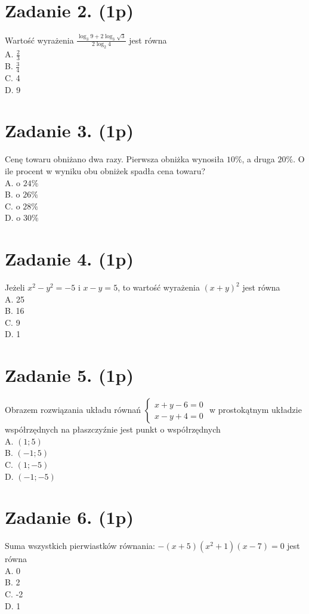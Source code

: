\documentclass[10pt]{article}
\begin{document}
\section*{Zadanie 2. (1p)}
Wartość wyrażenia \(\frac{\log _{3} 9+2 \log _{3} \sqrt{3}}{2 \log _{2} 4}\) jest równa\\
A. \(\frac{2}{3}\)\\
B. \(\frac{3}{4}\)\\
C. 4\\
D. 9

\section*{Zadanie 3. (1p)}
Cenę towaru obniżano dwa razy. Pierwsza obniżka wynosiła \(10 \%\), a druga \(20 \%\). O ile procent w wyniku obu obniżek spadła cena towaru?\\
A. o \(24 \%\)\\
B. o \(26 \%\)\\
C. o \(28 \%\)\\
D. o \(30 \%\)

\section*{Zadanie 4. (1p)}
Jeżeli \(x^{2}-y^{2}=-5\) i \(x-y=5\), to wartość wyrażenia \((x+y)^{2}\) jest równa\\
A. 25\\
B. 16\\
C. 9\\
D. 1

\section*{Zadanie 5. (1p)}
Obrazem rozwiązania układu równań \(\left\{\begin{array}{l}x+y-6=0 \\ x-y+4=0\end{array}\right.\) w prostokątnym układzie współrzędnych na płaszczyźnie jest punkt o współrzędnych\\
A. \((1 ; 5)\)\\
B. \((-1 ; 5)\)\\
C. \((1 ;-5)\)\\
D. \((-1 ;-5)\)

\section*{Zadanie 6. (1p)}
Suma wszystkich pierwiastków równania: \(-(x+5)\left(x^{2}+1\right)(x-7)=0\) jest równa\\
A. 0\\
B. 2\\
C. -2\\
D. 1
\end{document}
